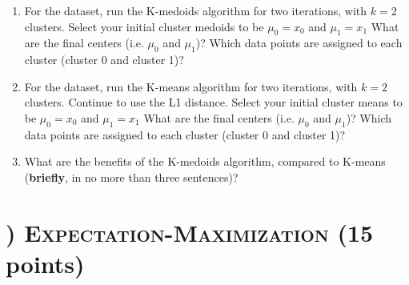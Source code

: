 \documentclass[11pt]{article}
\newcounter{QuestionCounter}
\newcounter{SubQuestionCounter}[QuestionCounter]
\newcommand{\newquestion}{\stepcounter{QuestionCounter}\setcounter{SubQuestionCounter}{1}\newpage}
\begin{document}
\begin{enumerate}[label=(\alph*)]
 
 

 \item For the dataset, run the K-medoids algorithm for two iterations, with $k=2$ clusters.  Select your initial cluster medoids to be $\mu_0 = x_0$ and $\mu_1=x_1$  What are the final centers (i.e. $\mu_0$ and $\mu_1$)?  Which data points are assigned to each cluster (cluster 0 and cluster 1)?
 
 \begin{answertext}{8cm}{}

\end{answertext}

 
 
  \item For the dataset, run the K-means algorithm for two iterations, with $k=2$ clusters. Continue to use the L1 distance. Select your initial cluster means to be $\mu_0 = x_0$ and $\mu_1=x_1$  What are the final centers (i.e. $\mu_0$ and $\mu_1$)?  Which data points are assigned to each cluster (cluster 0 and cluster 1)?
  
\begin{answertext}{8cm}{}

\end{answertext}

 \item What are the benefits of the K-medoids algorithm, compared to K-means (\textbf{briefly}, in no more than three sentences)?
 
\begin{answertext}{4cm}{}

\end{answertext}


\end{enumerate}




\newquestion
\section*{) \textsc{Expectation-Maximization} (15 points) }
\end{document}
